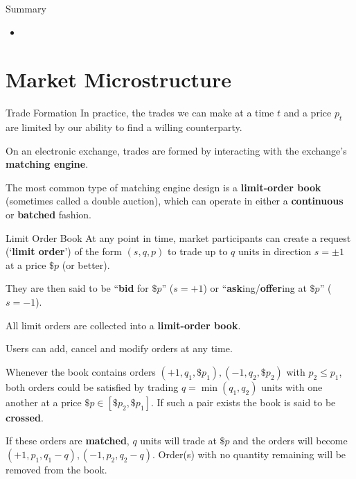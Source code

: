 \documentclass{beamer}
\begin{document}
\begin{frame}{Summary}
	\begin{itemize}
		\item 
	\end{itemize}
\end{frame}

\section{Market Microstructure}
\begin{frame}{Trade Formation}
	In practice, the trades we can make at a time $t$ and a price $p_t$ are limited by our ability to find a willing counterparty.

	On an electronic exchange, trades are formed by interacting with the exchange's \textbf{matching engine}.%

	The most common type of matching engine design is a \textbf{limit-order book} (sometimes called a double auction), which can operate in either a \textbf{continuous} or \textbf{batched} fashion.
\end{frame}

\begin{frame}{Limit Order Book}%
	At any point in time, market participants can create a request (`\textbf{limit order}') of the form $(s,q,p)$ to trade up to $q$ units in direction $s=\pm1$ at a price $\$p$ (or better). %
	
	They are then said to be ``\textbf{bid} for $\$p$'' ($s=+1$) or ``\textbf{ask}ing/\textbf{offer}ing at $\$p$'' ($s=-1$). %

	\pause

	All limit orders are collected into a \textbf{limit-order book}.

	Users can add, cancel and modify orders at any time.%

	\pause

	Whenever the book contains orders $(+1,q_1,\$p_1), (-1,q_2,\$p_2)$ with $p_2\leq p_1$, both orders could be satisfied by trading $q=\min(q_1,q_2)$ units with one another at a price $\$p\in[\$p_2,\$p_1]$. If such a pair exists the book is said to be \textbf{crossed}.

	If these orders are \textbf{matched}, $q$ units will trade at $\$p$ and the orders will become $(+1,p_1,q_1-q), (-1,p_2,q_2-q)$. %
	Order(s) with no quantity remaining will be removed from the book.
\end{frame}
\end{document}
